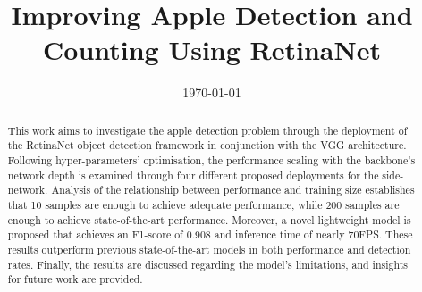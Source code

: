 \documentclass{ecsthesis}      	%
\begin{document}
\frontmatter
\title      {Improving Apple Detection and Counting Using RetinaNet}
\date       {\today}
\subject    {}
\keywords   {}
\maketitle
\begin{abstract}
This work aims to investigate the apple detection problem through the deployment of the RetinaNet object detection framework in conjunction with the VGG architecture. Following hyper-parameters' optimisation, the performance scaling with the backbone's network depth is examined through four different proposed deployments for the side-network. Analysis of the relationship between performance and training size establishes that 10 samples are enough to achieve adequate performance, while 200 samples are enough to achieve state-of-the-art performance. Moreover, a novel lightweight model is proposed that achieves an F1-score of 0.908 and inference time of nearly 70FPS. These results outperform previous state-of-the-art models in both performance and detection rates. Finally, the results are discussed regarding the model's limitations, and insights for future work are provided. 
\end{abstract}
\end{document}
